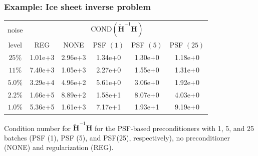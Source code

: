 \documentclass[10pt,final,xcolor=dvipsnames]{beamer}
\newcommand{\preconditioner}{\widetilde{H}}
\begin{document}
\begin{frame}
  \frametitle{Example: Ice sheet inverse problem}

  \begin{table}
    \begin{center}
      \begingroup
      \setlength{\tabcolsep}{4pt}
      \renewcommand{\arraystretch}{1.25}
      \begin{tabular}{c| c c c c c}
	noise    & \multicolumn{5}{c}{COND$(\mathbf{\preconditioner}^{-1} \mathbf{H})$ } \\ \cline{2-6}
	level    & REG     &	NONE  & PSF $(1)$ & PSF $(5)$ & PSF $(25)$ \\ \hline 
	$25\%$   & 1.01e+3 & 2.96e+3  & 1.34e+0   & 1.30e+0   & 1.18e+0    \\ 
	$11\%$   & 7.40e+3 & 1.05e+3  & 2.27e+0   & 1.55e+0   & 1.31e+0    \\   
	$5.0\%$  & 3.29e+4 & 4.96e+2  & 5.61e+0   & 3.06e+0   & 1.92e+0    \\ 
	$2.2\%$  & 1.66e+5 & 8.89e+2  & 1.58e+1   & 8.07e+0   & 4.03e+0    \\  
	$1.0\%$  & 5.36e+5 & 1.61e+3  & 7.17e+1   & 1.93e+1   & 9.19e+0    \\   
      \end{tabular}
      \endgroup
    \end{center}
  \end{table}

  \begin{center}
  Condition number for $\mathbf{\preconditioner}^{-1} \mathbf{H}$ for
  the PSF-based preconditioners with 1, 5, and 25 batches (PSF (1),
  PSF (5), and PSF(25), respectively), no preconditioner (NONE) and
  regularization (REG).
  \end{center}  
\end{frame}
\end{document}
